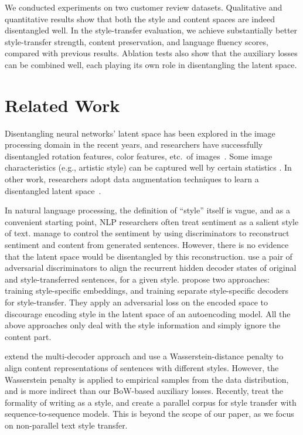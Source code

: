 \documentclass[letterpaper]{article} %
\begin{document}
We conducted experiments on two customer review datasets.
Qualitative and quantitative results show that both the style and content spaces are indeed disentangled well.
In the style-transfer evaluation, we achieve substantially better style-transfer strength, content preservation, and language fluency scores, compared with previous results.
Ablation tests also show that the auxiliary losses can be combined well, each playing its own role in disentangling the latent space.


\section{Related Work}

Disentangling neural networks' latent space has been explored in the image processing domain in the recent years, and researchers have successfully disentangled rotation features, color features, etc.~of images~\cite{chen2016infogan,luan2017deep}.
Some image characteristics (e.g., artistic style) can be captured well by certain statistics \cite{gatys2016image}.
In other work, researchers adopt data augmentation techniques to learn a disentangled latent space~\cite{kulkarni2015deep,champandard2016semantic}.

In natural language processing, the definition of ``style'' itself is vague, and as a convenient starting point, NLP researchers often treat sentiment as a salient style of text.
\citet{hu2017toward} manage to control the sentiment by using discriminators to reconstruct sentiment and content from generated sentences.
However, there is no evidence that the latent space would be disentangled by this reconstruction.
\citet{shen2017style} use a pair of adversarial discriminators to align the recurrent hidden decoder states of original and style-transferred sentences, for a given style.
\citet{fu2018style} propose two approaches: training style-specific embeddings, and training separate style-specific decoders for style-transfer.
They apply an adversarial loss on the encoded space to discourage encoding style in the latent space of an autoencoding model. All the above approaches only deal with the style information and simply ignore the content part.

\citet{zhao2018adversarially} extend the multi-decoder approach and use a Wasserstein-distance penalty to align content representations of sentences with different styles. However, the Wasserstein penalty is applied to  empirical samples from the data distribution, and is more indirect than our BoW-based auxiliary losses.
Recently, \citet{rao2018dear} treat the formality of writing as a style, and create a parallel corpus for style transfer with sequence-to-sequence models.
This is beyond the scope of our paper, as we focus on non-parallel text style transfer.
\end{document}
